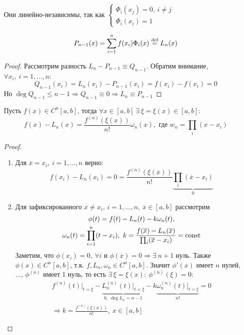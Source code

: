 Они линейно-независимы, так как
$\begin{cases}
    \Phi_i(x_j)=0,\ i\neq j \\
    \Phi_i(x_i)=1
  \end{cases}$
\begin{lemma*}
  $$P_{n-1}(x)=\sum_{i=1}^nf(x_i)\Phi_i(x)\stackrel{\text{def}}{=} L_n(x)$$
\end{lemma*}
\begin{proof}
  Рассмотрим разность $L_n-P_{n-1}\equiv Q_{n-1}$.
  Обратим внимание, $\forall x_i,\ i=1,\ldots,n$:
  $$Q_{n-1}(x_i)=L_n(x_i)-P_{n-1}(x_i)=f(x_i)-f(x_i)=0$$
  Но $\deg Q_{n-1}\leq n-1 \Rightarrow Q_{n-1}\equiv0\Rightarrow L_n\equiv P_{n-1}$
\end{proof}
\begin{theorem}
  Пусть $f(x)\in C^n[a,b]$, тогда $\forall x \in [a,b]\ \exists\ \xi=\xi(x)\in[a,b]:$
  $$f(x)-L_n(x)=\frac{f^{(n)}(\xi(x))}{n!}\omega_n(x),\text{ где } w_n=\prod_i(x-x_i)$$
\end{theorem}
\begin{proof}
  \begin{enumerate}
    \item Для $\overline{x}=x_i,\ i=1,\ldots,n$ верно:
          $$f(x_i)-L_n(x_i)=0=\frac{f^{(n)}(\xi(\overline{x}))}{n!}\underbrace{\prod_i(\overline{x}-x_i)}_{0}$$
    \item Для зафиксированного $\overline{x}\neq x_i,\ i=1,\ldots,n,\ \overline{x}\in[a,b]$ рассмотрим
          \begin{multline*}
            \phi(t)=f(t)-L_n(t)-k\omega_n(t),\\ \omega_n(t)=\prod_{i=1}^n(t-x_i),\ k=\frac{f(\overline{x})-L_n(\overline{x})}{\prod_i(\overline{x}-x_i)}=\const
          \end{multline*}
          Заметим, что $\phi(x_i)=0,\ \forall i$ и $\phi(\overline{x})=0\Rightarrow\exists\ n+1$ нуль. Также $\phi(x)\in C^n[a,b]$, т.к. $f, L_n, \omega_n\in C^n[a,b]$.
          Значит $\phi'(x)$ имеет $n$ нулей, $\ldots$, $\phi^{(n)}$ имеет 1 нуль, то есть $\exists\ \xi=\xi(x):\ \phi^{(n)}(\xi)=0$:
          \begin{multline*}
            f^{(n)}(t)\Bigr|_{t=\xi}-\underbrace{L_n^{(n)}(t)\Bigr|_{t=\xi}}_{0,\ \deg L_n=n-1}-k\underbrace{\omega_n^{(n)}(t)\Bigr|_{t=\xi}}_{n!}=0\\\Rightarrow k=\frac{f^{(n)}(\xi(x))}{n!},\ x\in[a,b]
          \end{multline*}
  \end{enumerate}
\end{proof}
